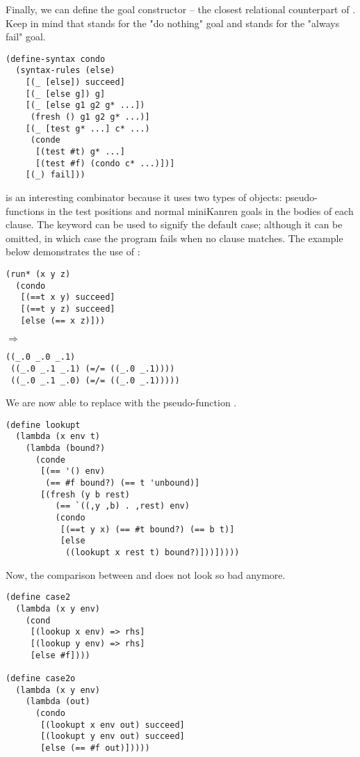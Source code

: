 Finally, we can define the goal constructor  -- the closest relational counterpart of . Keep in mind that  stands for the "do nothing" goal and  stands for the "always fail" goal.
\begin{lstlisting}
(define-syntax condo
  (syntax-rules (else)
    [(_ [else]) succeed]
    [(_ [else g]) g]
    [(_ [else g1 g2 g* ...])
     (fresh () g1 g2 g* ...)]
    [(_ [test g* ...] c* ...)
     (conde
      [(test #t) g* ...]
      [(test #f) (condo c* ...)])]
    [(_) fail]))
\end{lstlisting}
 is an interesting combinator because it uses two types of objects: pseudo-functions in the test positions and normal miniKanren goals in the bodies of each clause. The  keyword can be used to signify the default case; although it can be omitted, in which case the program fails when no clause matches. The example below demonstrates the use of :
\begin{lstlisting}
(run* (x y z)
  (condo
   [(==t x y) succeed]
   [(==t y z) succeed]
   [else (== x z)]))
\end{lstlisting}
$\Rightarrow$
\begin{lstlisting}
((_.0 _.0 _.1)
 ((_.0 _.1 _.1) (=/= ((_.0 _.1))))
 ((_.0 _.1 _.0) (=/= ((_.0 _.1)))))
\end{lstlisting}

We are now able to replace  with the pseudo-function .
\begin{lstlisting}
(define lookupt
  (lambda (x env t)
    (lambda (bound?)
      (conde
       [(== '() env)
        (== #f bound?) (== t 'unbound)]
       [(fresh (y b rest)
          (== `((,y ,b) . ,rest) env)
          (condo
           [(==t y x) (== #t bound?) (== b t)]
           [else
            ((lookupt x rest t) bound?)]))]))))
\end{lstlisting}
Now, the comparison between  and  does not look so bad anymore.
\begin{lstlisting}
(define case2
  (lambda (x y env)
    (cond
     [(lookup x env) => rhs]
     [(lookup y env) => rhs]
     [else #f])))

(define case2o
  (lambda (x y env)
    (lambda (out)
      (condo
       [(lookupt x env out) succeed]
       [(lookupt y env out) succeed]
       [else (== #f out)]))))
\end{lstlisting}

